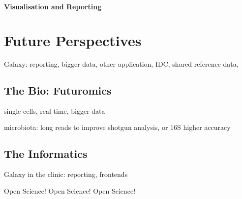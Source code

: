 \textbf{Visualisation and Reporting}



\section{Future Perspectives}

Galaxy: reporting, bigger data, other application, IDC, shared reference data,

\subsection{The Bio: Futuromics}
single cells, real-time, bigger data

microbiota: long reads to improve shotgun analysis, or 16S higher accuracy

\subsection{The Informatics}

Galaxy in the clinic: reporting, frontends

Open Science! Open Science! Open Science!



